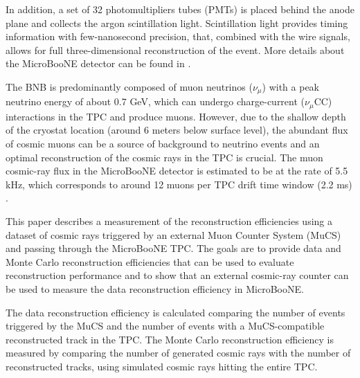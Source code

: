 \documentclass[a4paper,11pt]{article}
\begin{document}
In addition, a set of 32 photomultipliers tubes (PMTs) is placed behind the anode plane and collects the argon scintillation light. Scintillation light provides timing information with few-nanosecond precision, that, combined with the wire signals, allows for full three-dimensional reconstruction of the event. More details about the MicroBooNE detector can be found in \cite{detector}.

The BNB is predominantly composed of muon neutrinos ($\nu_{\mu}$) with a peak neutrino energy of about 0.7 GeV, which can undergo charge-current ($\nu_{\mu}$CC) interactions in the TPC and produce muons. However, due to the shallow depth of the cryostat location (around 6 meters below surface level), the abundant flux of cosmic muons can be a source of background to neutrino events and an optimal reconstruction of the cosmic rays in the TPC is crucial. The muon cosmic-ray flux in the MicroBooNE detector is estimated to be at the rate of 5.5 kHz, which corresponds to around 12 muons per TPC drift time window (2.2 ms) \cite{cosmic}.

This paper describes a measurement of the reconstruction efficiencies using a dataset of cosmic rays triggered by an external Muon Counter System (MuCS) and passing through the MicroBooNE TPC. The goals are to provide data and Monte Carlo reconstruction efficiencies that can be used to evaluate reconstruction performance and to show that an external cosmic-ray counter can be used to measure the data reconstruction efficiency in MicroBooNE.

The data reconstruction efficiency is calculated comparing the number of events triggered by the MuCS and the number of events with a MuCS-compatible reconstructed track in the TPC.
The Monte Carlo reconstruction efficiency is measured by comparing the number of generated cosmic rays with the number of reconstructed tracks, using simulated cosmic rays hitting the entire TPC.


\end{document}
